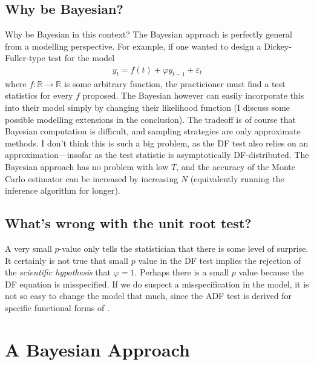 \documentclass{article}
\theoremstyle{definition}
\theoremstyle{exercise}
\theoremstyle{remark}
\begin{document}
\subsection*{Why be Bayesian?}
Why be Bayesian in this context?
The Bayesian approach is perfectly general from a modelling perspective. For example, if one wanted to design a Dickey-Fuller-type test for the model
\begin{align*}
    y_{t} = f(t) + \varphi y_{t-1} + \varepsilon_{t}
\end{align*}
where $f : \mathbb{R} \to \mathbb{R}$ is some arbitrary function, the practicioner must find a test statistics for every $f$ proposed.
The Bayesian however can easily incorporate this into their model simply by changing their likelihood function 
(I discuss some possible modelling extensions in the conclusion).
The tradeoff is of course that Bayesian computation is difficult, and sampling strategies are only approximate methods. I don't think this is such a big problem, as the DF test also relies on an approximation---insofar as the test statistic is asymptotically DF-distributed. The Bayesian approach has no problem with low $T$, and the accuracy of the Monte Carlo estimator can be increased by increasing $N$ (equivalently running the inference algorithm for longer).

\subsection*{What's wrong with the unit root test?}%

A very small $p$-value only tells the statistician that there is some level of surprise.
It certainly is not true that small $p$ value in the DF test implies the rejection of the \emph{scientific hypothesis} that $\varphi=1$.
Perhaps there is a small $p$ value because the DF equation \cite{eq:DF} is misspecified.
If we do suspect a misspecification in the model, it is not so easy to change the model that much, since the ADF test is derived for 
specific functional forms of \cite{eq:DF}.

\section*{A Bayesian Approach}%
\end{document}
